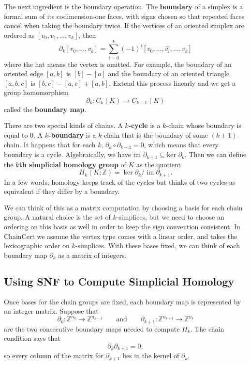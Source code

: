 \documentclass[11pt]{article}
\theoremstyle{plain}
\theoremstyle{definition}
\theoremstyle{remark}
\begin{document}
The next ingredient is the boundary operation. The \textbf{boundary} of a simplex is a formal sum of its codimension-one faces, with signs chosen so that repeated faces cancel when taking the boundary twice. If the vertices of an oriented simplex are ordered as $[v_0,v_1,\dots, v_k]$, then $$\partial_k[v_0,\dots,v_k] = \sum_{i=0}^k (-1)^i[v_0,\dots,\widehat{v_i},\dots, v_k]$$ where the hat means the vertex is omitted. For example, the boundary of an oriented edge $[a,b]$ is $[b]-[a]$ and the boundary of an oriented triangle $[a,b,c]$ is $[b,c]-[a,c] + [a,b]$. Extend this process linearly and we get a group homomorphism $$\partial_k : C_k(K) \to C_{k-1}(K)$$ called the \textbf{boundary map}. 

There are two special kinds of chains. A \textbf{$k$-cycle} is a $k$-chain whose boundary is equal to $0$. A \textbf{$k$-boundary} is a $k$-chain that is the boundary of some $(k+1)$-chain. It happens that for each $k$, $\partial_k\circ\partial_{k+1}=0$, which means that every boundary is a cycle. Algebraically, we have $\text{im }\partial_{k+1} \subseteq \text{ker }\partial_k$. Then we can define the \textbf{$k$th simplicial homology group} of $K$ as the quotient $$H_k(K;\mathbb Z) = \ker \partial_k / \operatorname{im}\partial_{k+1}.$$
 In a few words, homology keeps track of the cycles but thinks of two cycles as equivalent if they differ by a boundary. 

We can think of this as a matrix computation by choosing a basis for each chain group. A natural choice is the set of $k$-simplices, but we need to choose an ordering on this basis as well in order to keep the sign convention consistent. In ChainCert we assume the vertex type comes with a linear order, and takes the lexicographic order on $k$-simplices. With these bases fixed, we can think of each boundary map $\partial_k$ as a matrix of integers. 

\subsection{Using SNF to Compute Simplicial Homology}

Once bases for the chain groups are fixed, each boundary map is represented by
an integer matrix. Suppose that
\[
    \partial_k : \mathbb{Z}^{n_k} \to \mathbb{Z}^{n_{k-1}}
    \qquad\text{and}\qquad
    \partial_{k+1} : \mathbb{Z}^{n_{k+1}} \to \mathbb{Z}^{n_k}
\]
are the two consecutive boundary maps needed to compute $H_k$. The chain
condition says that
\[
    \partial_k \partial_{k+1} = 0,
\]
so every column of the matrix for $\partial_{k+1}$ lies in the kernel of
$\partial_k$.
\end{document}
